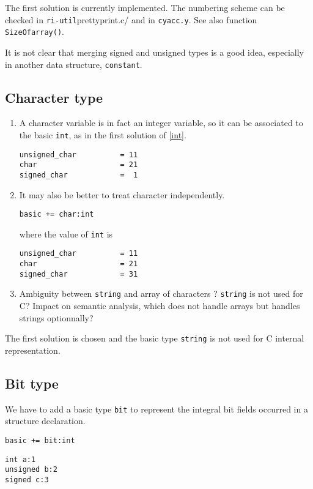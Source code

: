 \documentclass[a4paper]{report}
\begin{document}
The first solution is currently implemented. The numbering scheme can
 be checked in \verb/ri-util/prettyprint.c/ and in \verb/cyacc.y/. See
 also function \verb/SizeOfarray()/.

It is not clear that merging signed and unsigned types is a good idea,
 especially in another data structure, \verb/constant/.

\subsection{Character type} 

\begin{enumerate}
\item A character variable is in fact an integer variable, so it can
 be associated to the basic \verb/int/, as in the first solution of
 \ref{int}.
\begin{verbatim}
unsigned_char          = 11
char                   = 21
signed_char            =  1
\end{verbatim}

\item It may also be better to treat character independently. 

\verb/basic += char:int/

where the value of \verb/int/ is 
\begin{verbatim}
unsigned_char          = 11
char                   = 21
signed_char            = 31
\end{verbatim}

\item Ambiguity between \verb/string/ and array of characters ?
 \verb/string/ is not used for C? Impact on semantic analysis, which
 does not handle arrays but handles strings optionnally?

\end{enumerate}

The first solution is chosen and the basic type \verb/string/ is not
 used for C internal representation.

\subsection{Bit type}

We have to add a basic type \verb/bit/ to represent the integral bit fields
occurred in a structure declaration.   

\verb/basic += bit:int/
\begin{verbatim}
int a:1 
unsigned b:2 
signed c:3
\end{verbatim}
\end{document}
